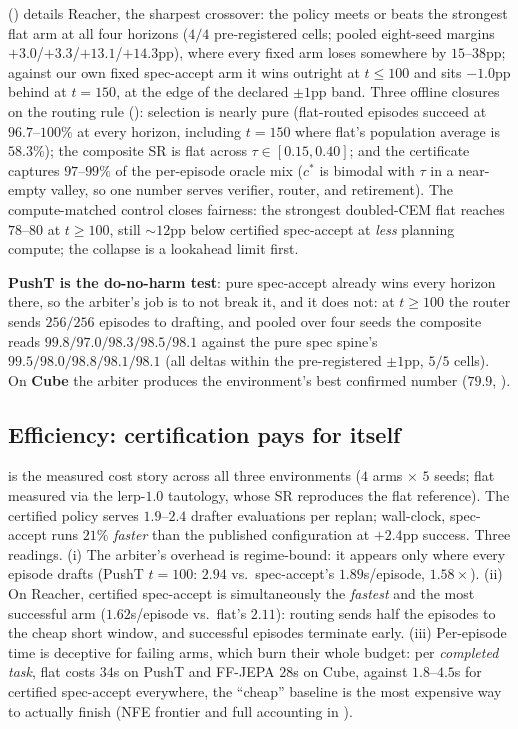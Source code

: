 \documentclass{article}
\begin{document}
 () details Reacher, the sharpest
crossover: the policy meets or beats the strongest flat arm at all four
horizons ($4/4$ pre-registered cells; pooled eight-seed margins
$+3.0$/$+3.3$/$+13.1$/$+14.3$pp), where every fixed arm loses somewhere by
$15$--$38$pp; against our own fixed spec-accept arm it wins outright at
$t{\le}100$ and sits $-1.0$pp behind at $t{=}150$, at the edge of the declared
$\pm1$pp band. Three offline closures on the routing rule
(): selection is nearly pure (flat-routed episodes
succeed at $96.7$--$100\%$ at every horizon, including $t{=}150$ where flat's
population average is $58.3\%$); the composite SR is flat across
$\tau\in[0.15,0.40]$; and the certificate captures $97$--$99\%$ of the
per-episode oracle mix ($c^{*}$ is bimodal with $\tau$ in a near-empty
valley, so one number serves verifier, router, and retirement). The
compute-matched control closes fairness: the strongest doubled-CEM flat
reaches $78$--$80$ at $t{\ge}100$, still ${\sim}12$pp below certified
spec-accept at \emph{less} planning compute; the collapse is a lookahead limit
first.

\textbf{PushT is the do-no-harm test}: pure spec-accept already wins every
horizon there, so the arbiter's job is to not break it, and it does not: at
$t{\ge}100$ the router sends $256/256$ episodes to drafting, and pooled over
four seeds the composite reads $99.8/97.0/98.3/98.5/98.1$ against the pure
spec spine's $99.5/98.0/98.8/98.1/98.1$ (all deltas within the pre-registered
$\pm1$pp, $5/5$ cells). On \textbf{Cube} the arbiter produces the
environment's best confirmed number ($79.9$, ).

\subsection{Efficiency: certification pays for itself}
\label{sec:results-eff}
 is the measured cost story across all three environments
($4$ arms $\times$ $5$ seeds; flat measured via the lerp-$1.0$ tautology,
whose SR reproduces the flat reference). The certified policy serves
$1.9$--$2.4$ drafter evaluations per
replan; wall-clock, spec-accept runs $21\%$ \emph{faster} than the published
configuration at $+2.4$pp success. Three readings. (i) The arbiter's overhead
is regime-bound: it appears only where every episode drafts (PushT $t{=}100$:
$2.94$ vs.\ spec-accept's $1.89$s/episode, $1.58\times$). (ii) On Reacher,
certified spec-accept is simultaneously the \emph{fastest} and the most
successful arm ($1.62$s/episode vs.\ flat's $2.11$): routing sends half the
episodes to the cheap short window, and successful episodes terminate early.
(iii) Per-episode time is deceptive for failing arms, which burn their whole
budget: per \emph{completed task}, flat costs $34$s on PushT and FF-JEPA
$28$s on Cube, against $1.8$--$4.5$s for certified spec-accept everywhere,
the ``cheap'' baseline is the most expensive way to actually finish (NFE
frontier and full accounting in ).
\end{document}
